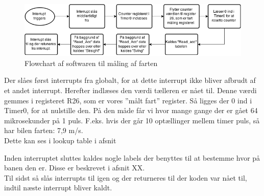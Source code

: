 \begin{figure}[h!]
\center
\includegraphics[scale=0.65]{./Graphics/fart_chart}
\caption{Flowchart af softwaren til måling af farten}
\label{fart_chart}
\end{figure}

Der slåes først interrupts fra globalt, for at dette interrupt ikke bliver afbrudt af et andet interrupt. Herefter indlæses den værdi tælleren er nået til. Denne værdi gemmes i registeret R26, som er vores ”målt fart” register. Så ligges der 0 ind i Timer0, for at nulstille den. På den måde får vi hvor mange gange der er gået 64 mikrosekunder på 1 puls. F.eks. hvis der går 10 optællinger mellem timer puls, så har bilen farten: 7,9 m/s. \\
Dette kan ses i lookup table i afsnit 

Inden interruptet sluttes kaldes nogle labels der benyttes til at bestemme hvor på banen den er. Disse er beskrevet i afsnit XX.  \\

Til sidst så slås interrupts til igen og der returneres til der koden var nået til, indtil næste interrupt bliver kaldt.  

